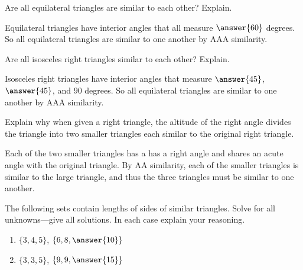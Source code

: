 \documentclass[nooutcomes]{ximera}
\begin{document}
\begin{question}
Are all equilateral triangles are similar to each other?  
 Explain.  
\begin{freeResponse}
\end{freeResponse}
\begin{feedback}[correct]
Equilateral triangles have interior angles that all measure $\answer{60}$ degrees.  So all equilateral triangles are similar to one another by AAA similarity.  
\end{feedback}
\end{question}

\begin{question}Are all isosceles right triangles similar to each other? 
 Explain.  
\begin{freeResponse}
\end{freeResponse}
\begin{feedback}[correct]
Isosceles right triangles have interior angles that measure $\answer{45}$, $\answer{45}$, and $90$ degrees.  So all equilateral triangles are similar to one another by AAA similarity.  
\end{feedback}
\end{question}

\begin{question}
Explain why when given a right triangle, the altitude of the
  right angle divides the triangle into two smaller triangles each
  similar to the original right triangle.
\begin{freeResponse}
\end{freeResponse}
\begin{hint}
Each of the two smaller triangles has a has a right angle and shares an acute angle with the original triangle.  By AA similarity, each of the smaller triangles is similar to the large triangle, and thus the three triangles must be similar to one another.  
\end{hint}
\end{question}

\begin{question}
The following sets contain lengths of sides of similar
  triangles. Solve for all unknowns---give all solutions. In each case
  explain your reasoning.
\begin{enumerate}
\item $\{3,4,5\}$, $\{6,8,\answer{10}\}$
\item $\{3,3,5\}$, $\{9,9,\answer{15}\}$
\end{enumerate}
\end{question}
\end{document}

